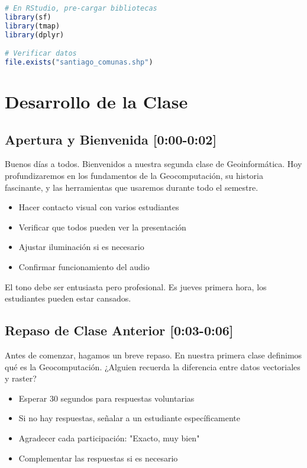 \documentclass[11pt,a4paper]{article}
\newcommand{\tiempo}[1]{\textcolor{timecolor}{\textbf{[#1]}}}
\newcommand{\decir}[1]{\begin{tcolorbox}[colback=blue!5,colframe=usachblue,title={DECIR}]#1\end{tcolorbox}}
\newcommand{\hacer}[1]{\begin{tcolorbox}[colback=green!5,colframe=green!50!black,title={HACER}]#1\end{tcolorbox}}
\newcommand{\nota}[1]{\begin{tcolorbox}[colback=yellow!10,colframe=orange,title={NOTA}]#1\end{tcolorbox}}
\begin{document}
\begin{lstlisting}[language=R, caption=Terminal 2: Preparar R]
# En RStudio, pre-cargar bibliotecas
library(sf)
library(tmap)
library(dplyr)

# Verificar datos
file.exists("santiago_comunas.shp")
\end{lstlisting}

\newpage

\section{Desarrollo de la Clase}

\subsection{Apertura y Bienvenida \tiempo{0:00-0:02}}

\decir{Buenos días a todos. Bienvenidos a nuestra segunda clase de Geoinformática. Hoy profundizaremos en los fundamentos de la Geocomputación, su historia fascinante, y las herramientas que usaremos durante todo el semestre.}

\hacer{
\begin{itemize}
    \item Hacer contacto visual con varios estudiantes
    \item Verificar que todos pueden ver la presentación
    \item Ajustar iluminación si es necesario
    \item Confirmar funcionamiento del audio
\end{itemize}
}

\nota{El tono debe ser entusiasta pero profesional. Es jueves primera hora, los estudiantes pueden estar cansados.}

\subsection{Repaso de Clase Anterior \tiempo{0:03-0:06}}

\decir{Antes de comenzar, hagamos un breve repaso. En nuestra primera clase definimos qué es la Geocomputación. ¿Alguien recuerda la diferencia entre datos vectoriales y raster?}

\hacer{
\begin{itemize}
    \item Esperar 30 segundos para respuestas voluntarias
    \item Si no hay respuestas, señalar a un estudiante específicamente
    \item Agradecer cada participación: "Exacto, muy bien"
    \item Complementar las respuestas si es necesario
\end{itemize}
}
\end{document}
